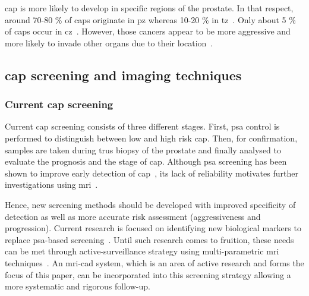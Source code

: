\ac{cap} is more likely to develop in specific regions of the prostate. In that respect, around 70-80 \% of \acp{cap} originate in \ac{pz} whereas 10-20 \% in \ac{tz}~\cite{Carrol1987,McNeal1988,Stamey1998}. Only about 5 \% of \acp{cap} occur in \ac{cz}~\cite{McNeal1988,Cohen2008}. However, those cancers appear to be more aggressive and more likely to invade other organs due to their location~\cite{Cohen2008}.

\subsection{\ac{cap} screening and imaging techniques}

\subsubsection{Current \ac{cap} screening}\label{subsubsec:curscr}

Current \ac{cap} screening consists of three different stages. First, \ac{psa} control is performed to distinguish between low and high risk \ac{cap}. Then, for confirmation, samples are taken during \ac{trus} biopsy of the prostate and finally analysed to evaluate the prognosis and the stage of \ac{cap}. Although \ac{psa} screening has been shown to improve early detection of \ac{cap}~\cite{Chou2011}, its lack of reliability motivates further investigations using \ac{mri}~\cite{Andriole2009,Schroeder2012, Hugosson2010}.

Hence, new screening methods should be developed with improved specificity of detection as well as more accurate risk assessment (aggressiveness and progression). Current research is focused on identifying new biological markers to replace \ac{psa}-based screening~\cite{Bourdoumis2010,Morgan2011,Brenner2013}. Until such research comes to fruition, these needs can be met through active-surveillance strategy using multi-parametric \ac{mri} techniques~\cite{Hoeks2011,Moore2013}. An \ac{mri}-\acs{cad} system, which is an area of active research and forms the focus of this paper, can be incorporated into this screening strategy allowing a more systematic and rigorous follow-up.

